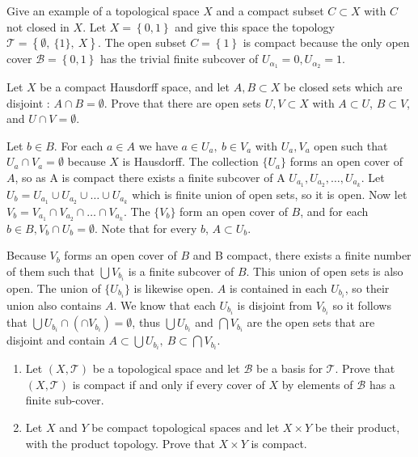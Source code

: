 \documentclass{jhwhw}
\newcommand{\T}{{\mathcal T}}
\newcommand{\B}{{\mathcal B}}
\begin{document}
\problem{} %
Give an example of a topological space $X$ and a compact subset $C\subset X$ with $C$ not closed in $X$.
\solution{}
Let $X=\left\{ 0,1\right\}$ and give this space the topology $\T=\left\{ \emptyset,\  \{1\},\ X\right\}$. The open subset $C=\left\{ 1\right\}$ is compact because the only open cover $\B =\left\{0,1\right\}$ has the trivial finite subcover of $U_{\alpha_1}=0, U_{\alpha_2}=1$. 


\problem{}%
Let $X$ be a compact Hausdorff space, and let $A,B\subset X$ be closed sets which are  disjoint : $A\cap B =\emptyset$.  Prove that there are open sets $U,V\subset X$ with $A\subset U$, $B\subset V$, and $U\cap V = \emptyset$. 

\solution{}
Let $b \in B$. For each $a \in A$ we have $a \in U_a ,\ b \in V_a $ with $U_a, V_a$ open such that $U_a \cap V_a = \emptyset$ because $X$ is Hausdorff. The collection $\{U_a\}$ forms an open cover of $A$, so as A is compact there exists a finite subcover of A $U_{a_1}, U_{a_2}, \ldots, U_{a_k}$. Let $U_b = U_{a_1} \cup U_{a_2} \cup \dots \cup U_{a_k}$ which is finite union of open sets, so it is open. Now let $V_b = V_{a_1} \cap V_{a_2} \cap \dots \cap V_{a_k}$. The $\{V_b\}$ form an open cover of $B$, and for each $b \in B, V_b \cap U_b = \emptyset$.  Note that for every $b$, $A \subset U_b$. 

Because $V_b$ forms an open cover of $B$ and B compact, there exists a finite number of them such that $ \bigcup V_{b_i}$ is a finite subcover of $B$. This union of open sets is also open. The union of $\{U_{b_i}\}$ is likewise open. $A$ is contained in each $U_{b_i}$, so their union also contains $A$. We know that each $U_{b_i}$ is disjoint from $V_{b_i}$ so it follows that $\bigcup U_{b_i} \cap \left( \cap V_{b_i} \right) = \emptyset$, thus $\bigcup U_{b_i}$ and $\bigcap V_{b_i}$ are the open sets that are disjoint and contain $A\subset\bigcup U_{b_i} ,\ B\subset\bigcap V_{b_i} $.  



\problem{}%
\begin{enumerate}
	\item Let $(X,\T)$ be a topological space and let $\B$ be a basis for $\T$.  Prove that $(X,\T)$ is compact if and only if every cover of $X$ by elements of $\B$ has a finite sub-cover. 
	\item Let $X$ and $Y$ be compact topological spaces and let $X\times Y$ be their product, with the product topology.   Prove that $X\times Y$ is compact.
	
\end{enumerate}
\solution{}
\end{document}

